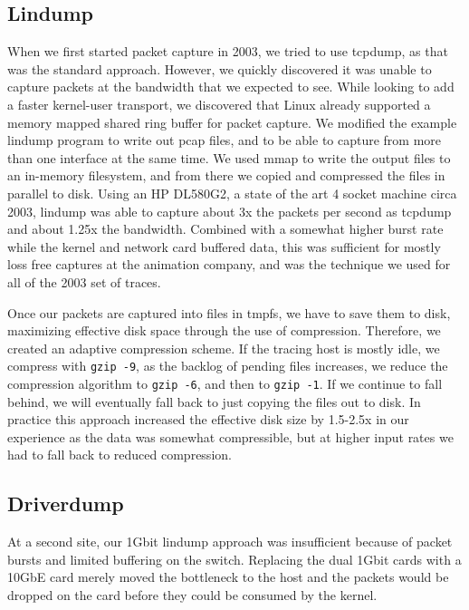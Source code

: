\subsection{Lindump}

When we first started packet capture in 2003, we tried to use tcpdump,
as that was the standard approach.  However, we quickly discovered it
was unable to capture packets at the bandwidth that we expected to
see.  While looking to add a faster kernel-user transport, we
discovered that Linux already supported a memory mapped shared ring
buffer for packet capture. We modified the example lindump program to
write out pcap files, and to be able to capture from more than one
interface at the same time.  We used mmap to write the output files to
an in-memory filesystem, and from there we copied and compressed the
files in parallel to disk.  Using an HP DL580G2, a state of the art
4 socket machine circa 2003, lindump was able to capture about 3x the
packets per second as tcpdump and about 1.25x the bandwidth.  Combined
with a somewhat higher burst rate while the kernel and network card
buffered data, this was sufficient for mostly loss free captures at
the animation company, and was the technique we used for all of the
2003 set of traces.

Once our packets are captured into files in tmpfs, we have to save
them to disk, maximizing effective disk space through the use of
compression.  Therefore, we created an adaptive compression scheme.
If the tracing host is mostly idle, we compress with {\tt gzip -9}, as
the backlog of pending files increases, we reduce the compression
algorithm to {\tt gzip -6}, and then to {\tt gzip -1}.  If we continue
to fall behind, we will eventually fall back to just copying the files
out to disk.  In practice this approach increased the effective disk
size by 1.5-2.5x in our experience as the data was somewhat
compressible, but at higher input rates we had to fall back to reduced
compression.

\subsection{Driverdump}

At a second site, our 1Gbit lindump approach was insufficient
because of packet bursts and limited buffering on the switch.
Replacing the dual 1Gbit cards with a 10GbE card merely moved the
bottleneck to the host and the packets would be dropped on the card
before they could be consumed by the kernel.

